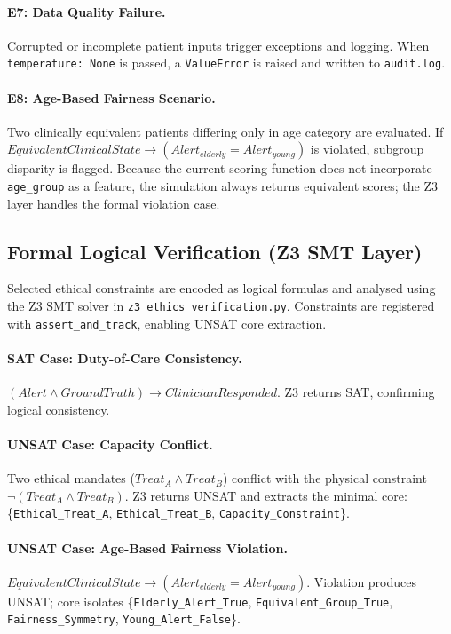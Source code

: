 \documentclass[]{UCD_CS_41820_Report}
\begin{document}
\paragraph{E7: Data Quality Failure.}
Corrupted or incomplete patient inputs trigger exceptions and logging. When
\texttt{temperature: None} is passed, a \texttt{ValueError} is raised and written
to \texttt{audit.log}.

\paragraph{E8: Age-Based Fairness Scenario.}
Two clinically equivalent patients differing only in age category are evaluated.
If $EquivalentClinicalState \rightarrow (Alert_{elderly} = Alert_{young})$ is
violated, subgroup disparity is flagged. Because the current scoring function does
not incorporate \texttt{age\_group} as a feature, the simulation always returns
equivalent scores; the Z3 layer handles the formal violation case.

\subsection{Formal Logical Verification (Z3 SMT Layer)}
Selected ethical constraints are encoded as logical formulas and analysed using the
Z3 SMT solver in \texttt{z3\_ethics\_verification.py}. Constraints are registered
with \texttt{assert\_and\_track}, enabling UNSAT core extraction.

\paragraph{SAT Case: Duty-of-Care Consistency.}
$(Alert \land GroundTruth) \rightarrow ClinicianResponded$. Z3 returns SAT,
confirming logical consistency.

\paragraph{UNSAT Case: Capacity Conflict.}
Two ethical mandates ($Treat_A \land Treat_B$) conflict with the physical constraint
$\neg(Treat_A \land Treat_B)$. Z3 returns UNSAT and extracts the minimal core:
\{\texttt{Ethical\_Treat\_A}, \texttt{Ethical\_Treat\_B}, \texttt{Capacity\_Constraint}\}.

\paragraph{UNSAT Case: Age-Based Fairness Violation.}
$EquivalentClinicalState \rightarrow (Alert_{elderly} = Alert_{young})$. Violation
produces UNSAT; core isolates \{\texttt{Elderly\_Alert\_True},
\texttt{Equivalent\_Group\_True}, \texttt{Fairness\_Symmetry},
\texttt{Young\_Alert\_False}\}.
\end{document}
